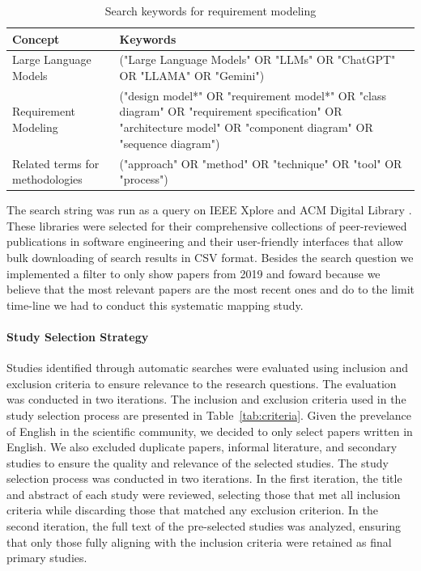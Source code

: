 \begin{table}[htb]
  \centering
  \small
  \begin{tabular}{p{6cm} p{8cm}}
    \toprule
    \textbf{Concept} & \textbf{Keywords} \\ 
    \midrule
    Large Language Models & ("Large Language Models" OR "LLMs" OR "ChatGPT" OR "LLAMA" OR "Gemini") \\ 
    \addlinespace
    Requirement Modeling & ("design model*" OR "requirement model*" OR "class diagram" OR "requirement specification" OR "architecture model" OR "component diagram" OR "sequence diagram") \\ 
    \addlinespace
    Related terms for methodologies & ("approach" OR "method" OR "technique" OR "tool" OR "process") \\ 
    \bottomrule
  \end{tabular}
  \caption{Search keywords for requirement modeling} %
  \label{tab:search_keywords} %
\end{table}
The search string was run as a query on IEEE Xplore \cite{ieeeXplore} and ACM Digital Library \cite{acmLibrary}. These libraries were selected for their comprehensive collections of peer-reviewed publications in software engineering and their user-friendly interfaces that allow bulk downloading of search results in CSV format.
Besides the search question we implemented a filter to only show papers from 2019 and foward because we believe that the most relevant papers are the most recent ones and do to the limit time-line we had to conduct this systematic mapping study.

\paragraph{Study Selection Strategy}
Studies identified through automatic searches were evaluated using inclusion and exclusion criteria to ensure relevance to the research questions. The evaluation was conducted in two iterations.
The inclusion and exclusion criteria used in the study selection process are presented in Table~\ref{tab:criteria}. Given the prevelance of English in the scientific community, we decided to only select papers written in English. We also excluded duplicate papers, informal literature, and secondary studies to ensure the quality and relevance of the selected studies.
The study selection process was conducted in two iterations. In the first iteration, the title and abstract of each study were reviewed, selecting those that met all inclusion criteria while discarding those that matched any exclusion criterion. In the second iteration, the full text of the pre-selected studies was analyzed, ensuring that only those fully aligning with the inclusion criteria were retained as final primary studies.


